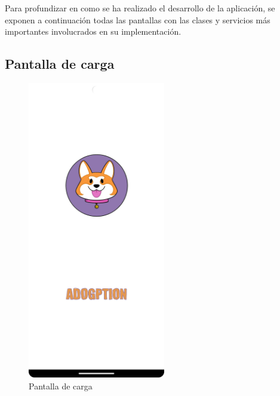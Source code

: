 \documentclass[a4paper, 12pt]{article}
\begin{document}
Para profundizar en como se ha realizado el desarrollo de la aplicación, se exponen a continuación todas las pantallas con las clases y servicios más importantes involucrados en su implementación.

\subsection*{Pantalla de carga}

\begin{figure}[H]
	\begin{center}
		{\includegraphics[width=6cm]{app/Splashscreen.png}\par}
		\caption{Pantalla de carga}
	\end{center}
\end{figure}
\end{document}
